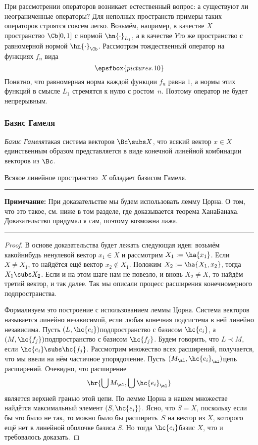 \documentclass[a4paper]{article}
\newcommand{\comment}[1]{\par\vskip2pt\hrule\vskip2pt{\footnotesize \textbf{Примечание:} #1\par}\vskip2pt\hrule\vskip2pt}
\begin{document}
При рассмотрении операторов возникает естественный вопрос: а существуют ли неограниченные операторы?
Для неполных пространств примеры таких операторов строятся совсем легко. Возьмём,
например, в качестве $X$ пространство $\Cb[0,1]$ с нормой $\hn{\cdot}_{L_1}$,
а в качестве $Y$\т то же пространство с равномерной нормой $\hn{\cdot}_\Cb$.
Рассмотрим тождественный оператор на функциях $f_n$ вида
$$\epsfbox{pictures.10}$$
Понятно, что равномерная норма каждой функции $f_n$ равна $1$, а нормы этих функций в смысле $L_1$ стремятся к
нулю с ростом~$n$. Поэтому оператор не будет непрерывным.

\subsubsection{Базис Гамеля}

\begin{df}
\emph{Базис Гамеля}\т такая система векторов $\Bc \subs X$,
что всякий вектор $x \in X$ единственным образом представляется в виде конечной линейной комбинации
векторов из $\Bc$.
\end{df}

\begin{theorem}
Всякое линейное пространство~$X$ обладает базисом Гамеля.
\end{theorem}
\comment{При доказательстве мы будем использовать лемму Цорна. О том, что это такое,
см. ниже в том разделе, где доказывается теорема Хана\ч Банаха.
Доказательство придумал я сам, поэтому возможна лажа.}
\begin{proof}
В основе доказательства будет лежать следующая идея:
возьмём какой\д нибудь ненулевой вектор $x_1 \in X$ и рассмотрим $X_1 := \ha{x_1}$.
Если $X \neq X_1$, то найдётся ещё вектор $x_2 \notin X_1$. Положим $X_2 := \ha{X_1,x_2}$,
тогда $X_1 \subs X_2$. Если и на этом шаге нам не повезло, и вновь $X_2 \neq X$,
то найдём третий вектор, и так далее. Так мы описали процесс расширения конечномерного подпространства.

Формализуем это построение с использованием леммы Цорна.
Система векторов называется линейно независимой, если любая конечная подсистема в ней линейно независима.
Пусть $(L, \hc{e_i})$\т подпространство с базисом $\hc{e_i}$, а $(M, \hc{f_j})$\т подпространство
с базисом $\hc{f_j}$. Будем говорить, что $L \prec M$, если $\hc{e_i} \subs \hc{f_j}$.
Рассмотрим множество всех расширений, получается, что мы ввели на нём
частичное упорядочение. Пусть $(M_\al, \hc{e_i}_\al)$\т цепь расширений.
Очевидно, что расширение
$$\hr{\bigcup M_\al, \bigcup \hc{e_i}_\al}$$ является верхней гранью этой цепи.
По лемме Цорна в нашем множестве найдётся максимальный элемент $(S,\hc{e_i})$.
Ясно, что $S = X$, поскольку если бы это было не так, то можно было бы расширить~$S$ на
вектор из $X$, которого ещё нет в линейной оболочке базиса $S$.
Но тогда $\hc{e_i}$\т базис $X$, что и требовалось доказать.
\end{proof}
\end{document}
